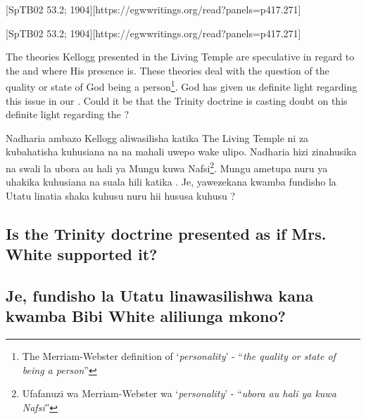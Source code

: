 [SpTB02 53.2; 1904][https://egwwritings.org/read?panels=p417.271]


[SpTB02 53.2; 1904][https://egwwritings.org/read?panels=p417.271]


The theories Kellogg presented in the Living Temple are speculative in regard to the  and where His presence is. These theories deal with the question of the quality or state of God being a person\footnote{The Merriam-Webster definition of ‘\textit{personality}’ - “\textit{the quality or state of being a person}”}. God has given us definite light regarding this issue in our . Could it be that the Trinity doctrine is casting doubt on this definite light regarding the ?


Nadharia ambazo Kellogg aliwasilisha katika The Living Temple ni za kubahatisha kuhusiana na  na mahali uwepo wake ulipo. Nadharia hizi zinahusika na swali la ubora au hali ya Mungu kuwa Nafsi\footnote{Ufafanuzi wa Merriam-Webster wa ‘\textit{personality}’ - “\textit{ubora au hali ya kuwa Nafsi}”}. Mungu ametupa nuru ya uhakika kuhusiana na suala hili katika . Je, yawezekana kwamba fundisho la Utatu linatia shaka kuhusu nuru hii hususa kuhusu ?


\subsection*{Is the Trinity doctrine presented as if Mrs. White supported it?}


\subsection*{Je, fundisho la Utatu linawasilishwa kana kwamba Bibi White aliliunga mkono?}


